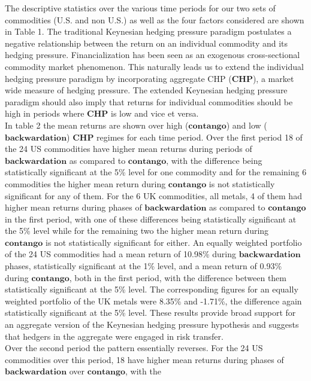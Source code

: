 \documentclass[11pt, letterpaper, doublespacing]{article}
\begin{document}
The descriptive statistics over the various time periods for our two
sets of commodities (U.S. and non U.S.) as well as the four factors
considered are shown in Table 1. The traditional Keynesian hedging
pressure paradigm postulates a negative relationship between the return
on an individual commodity and its hedging pressure. Financialization
has been seen as an exogenous cross-sectional commodity market
phenomenon. This naturally leads us to extend the individual hedging
pressure paradigm by incorporating aggregate CHP (\(\mathbf{CHP}\)), a
market wide measure of hedging pressure. The extended Keynesian hedging
pressure paradigm should also imply that returns for individual
commodities should be high in periods where \(\mathbf{CHP}\) is low and
vice et versa.\\
In table 2 the mean returns are shown over high (\(\mathbf{contango}\))
and low (\(\mathbf{backwardation}\)) \(\mathbf{CHP}\) regimes for each
time period. Over the first period 18 of the 24 US commodities have
higher mean returns during periods of \(\mathbf{backwardation}\) as
compared to \(\mathbf{contango}\), with the difference being
statistically significant at the 5\% level for one commodity and for the
remaining 6 commodities the higher mean return during
\(\mathbf{contango}\) is not statistically significant for any of them.
For the 6 UK commodities, all metals, 4 of them had higher mean returns
during phases of \(\mathbf{backwardation}\) as compared to
\(\mathbf{contango}\) in the first period, with one of these differences
being statistically significant at the 5\% level while for the remaining
two the higher mean return during \(\mathbf{contango}\) is not
statistically significant for either. An equally weighted portfolio of
the 24 US commodities had a mean return of 10.98\% during
\(\mathbf{backwardation}\) phases, statistically significant at the 1\%
level, and a mean return of 0.93\% during \(\mathbf{contango}\), both in
the first period, with the difference between them statistically
significant at the 5\% level. The corresponding figures for an equally
weighted portfolio of the UK metals were 8.35\% and -1.71\%, the
difference again statistically significant at the 5\% level. These
results provide broad support for an aggregate version of the Keynesian
hedging pressure hypothesis and suggests that hedgers in the aggregate
were engaged in risk transfer.\\
Over the second period the pattern essentially reverses. For the 24 US
commodities over this period, 18 have higher mean returns during phases
of \(\mathbf{backwardation}\) over \(\mathbf{contango}\), with the
\end{document}
